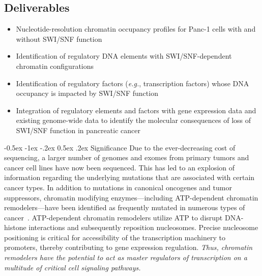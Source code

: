 \documentclass[11pt]{article}
\makeatletter
\renewcommand\section{\@startsection {section}{1}{\z@}%
{-0.5ex \@plus -1ex \@minus -.2ex}%
{0.5ex \@plus.2ex}%
{\color{dukeblue}\sffamily\Large\bfseries}}
\newcommand\panc{Panc\dash1\xspace}
\newcommand\eg{\emph{e.g.}\xspace}
\newcommand\dash{\nobreakdash-\hspace{0pt}}
\makeatother
\begin{document}
\begin{center}
\subsection*{\sffamily \color{dukeblue} Deliverables}
\end{center}
\begin{itemize}
\addtolength{\itemsep}{-2mm}
\item Nucleotide-resolution chromatin occupancy profiles for \panc cells with and without SWI/SNF function
\item Identification of regulatory DNA elements with SWI/SNF-dependent chromatin configurations
\item Identification of regulatory factors (\eg, transcription factors) whose DNA occupancy is impacted by SWI/SNF function
\item Integration of regulatory elements and factors with gene expression data and existing genome-wide data to identify the molecular consequences of loss of SWI/SNF function in pancreatic cancer

\end{itemize}

\pagebreak
 
\section{Significance}
 Due to the ever-decreasing cost of sequencing, a larger number of genomes and exomes from primary tumors and cancer cell lines have now been sequenced. This has led to an explosion of information regarding the underlying mutations that are associated with certain cancer types.  In addition to mutations in canonical oncogenes and tumor suppressors, chromatin modifying enzymes---including ATP-dependent chromatin remodelers---have been identified as frequently mutated in numerous types of cancer~\citep{Timp2013}.  ATP-dependent chromatin remodelers utilize ATP to disrupt DNA-histone interactions and subsequently reposition nucleosomes. Precise nucleosome positioning is critical for accessibility of the transcription machinery to promoters, thereby contributing to gene expression regulation. \emph{\color{dukeblue}Thus, chromatin remodelers have the potential to act as master regulators of transcription on a multitude of critical cell signaling pathways.}
\end{document}
